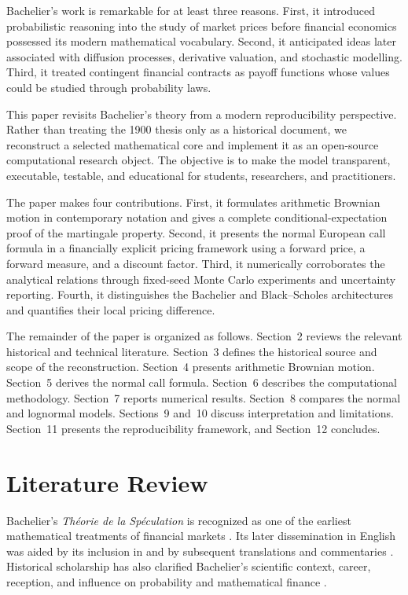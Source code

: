 \documentclass[11pt,a4paper]{article}
\begin{document}
Bachelier's work is remarkable for at least three reasons. First, it introduced probabilistic reasoning into the study of market prices before financial economics possessed its modern mathematical vocabulary. Second, it anticipated ideas later associated with diffusion processes, derivative valuation, and stochastic modelling. Third, it treated contingent financial contracts as payoff functions whose values could be studied through probability laws.

This paper revisits Bachelier's theory from a modern reproducibility perspective. Rather than treating the 1900 thesis only as a historical document, we reconstruct a selected mathematical core and implement it as an open-source computational research object. The objective is to make the model transparent, executable, testable, and educational for students, researchers, and practitioners.

The paper makes four contributions. First, it formulates arithmetic Brownian motion in contemporary notation and gives a complete conditional-expectation proof of the martingale property. Second, it presents the normal European call formula in a financially explicit pricing framework using a forward price, a forward measure, and a discount factor. Third, it numerically corroborates the analytical relations through fixed-seed Monte Carlo experiments and uncertainty reporting. Fourth, it distinguishes the Bachelier and Black--Scholes architectures and quantifies their local pricing difference.

The remainder of the paper is organized as follows. Section~2 reviews the relevant historical and technical literature. Section~3 defines the historical source and scope of the reconstruction. Section~4 presents arithmetic Brownian motion. Section~5 derives the normal call formula. Section~6 describes the computational methodology. Section~7 reports numerical results. Section~8 compares the normal and lognormal models. Sections~9 and~10 discuss interpretation and limitations. Section~11 presents the reproducibility framework, and Section~12 concludes.

\section{Literature Review}

Bachelier's \emph{Th\'eorie de la Sp\'eculation} is recognized as one of the earliest mathematical treatments of financial markets \citep{bachelier1900}. Its later dissemination in English was aided by its inclusion in \citet{cootner1964} and by subsequent translations and commentaries \citep{bachelier1964,davisetheridge2006}. Historical scholarship has also clarified Bachelier's scientific context, career, reception, and influence on probability and mathematical finance \citep{courtault2000}.
\end{document}
